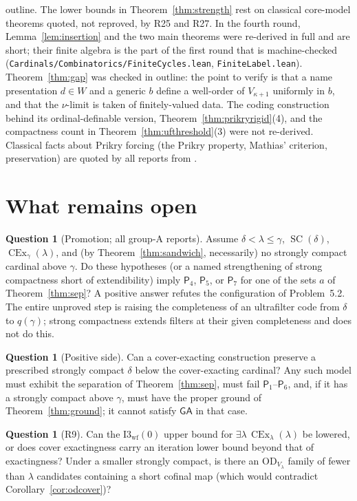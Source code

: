 \documentclass[11pt,letterpaper]{article}
\theoremstyle{definition}
\newtheorem{question}[definition]{Question}
\numberwithin{equation}{section}
\newcommand{\GA}{\mathsf{GA}}
\newcommand{\OD}{\mathrm{OD}}
\newcommand{\SC}{\operatorname{SC}}
\newcommand{\CEx}{\operatorname{CEx}}
\newcommand{\Iwf}{\mathrm{I3}_{\mathrm{wf}}(0)}
\newcommand{\R}[1]{\textsf{R#1}}
\begin{document}
outline. The lower bounds in Theorem~\ref{thm:strength} rest on classical core-model theorems quoted, not reproved, by \R{25} and \R{27}. In the fourth round, Lemma~\ref{lem:insertion} and the two main theorems were re-derived in full and are short; their finite algebra is the part of the first round that is machine-checked (\nolinkurl{Cardinals/Combinatorics/FiniteCycles.lean}, \nolinkurl{FiniteLabel.lean}). Theorem~\ref{thm:gap} was checked in outline: the point to verify is that a name presentation $d\in W$ and a generic $b$ define a well-order of $V_{\kappa+1}$ uniformly in $b$, and that the $\nu$-limit is taken of finitely-valued data. The coding construction behind its ordinal-definable version, Theorem~\ref{thm:prikryrigid}(4), and the compactness count in Theorem~\ref{thm:ufthreshold}(3) were not re-derived. Classical facts about Prikry forcing (the Prikry property, Mathias' criterion, preservation) are quoted by all reports from \cite{prikry,mathias}.

\section{What remains open}\label{sec:open}

\begin{question}[Promotion; all group-A reports]
Assume $\delta<\lambda\le\gamma$, $\SC(\delta)$, $\CEx_\gamma(\lambda)$, and (by Theorem~\ref{thm:sandwich}, necessarily) no strongly compact cardinal above $\gamma$. Do these hypotheses (or a named strengthening of strong compactness short of extendibility) imply $\mathsf P_4$, $\mathsf P_5$, or $\mathsf P_7$ for one of the sets $a$ of Theorem~\ref{thm:sep}? A positive answer refutes the configuration of Problem~5.2. The entire unproved step is raising the completeness of an ultrafilter code from $\delta$ to $q(\gamma)$; strong compactness extends filters at their given completeness and does not do this.
\end{question}

\begin{question}[Positive side]
Can a cover-exacting construction preserve a prescribed strongly compact $\delta$ below the cover-exacting cardinal? Any such model must exhibit the separation of Theorem~\ref{thm:sep}, must fail $\mathsf P_1$--$\mathsf P_6$, and, if it has a strongly compact above $\gamma$, must have the proper ground of Theorem~\ref{thm:ground}; it cannot satisfy $\GA$ in that case.
\end{question}

\begin{question}[\R9]
Can the $\Iwf$ upper bound for $\exists\lambda\,\CEx_\lambda(\lambda)$ be lowered, or does cover exactingness carry an iteration lower bound beyond that of exactingness? Under a smaller strongly compact, is there an $\OD_{V_\lambda}$ family of fewer than $\lambda$ candidates containing a short cofinal map (which would contradict Corollary~\ref{cor:odcover})?
\end{question}
\end{document}
